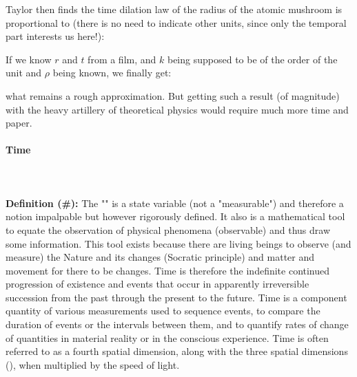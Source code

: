 	\begin{tcolorbox}[colframe=black,colback=white,sharp corners]
	
	Taylor then finds the time dilation law of the radius of the atomic mushroom is proportional to (there is no need to indicate other units, since only the temporal part interests us here!):
	
	If we know $r$ and $t$ from a film, and $k$ being supposed to be of the order of the unit and $\rho$ being known, we finally get:
	
	what remains a rough approximation. But getting such a result (of magnitude) with the heavy artillery of theoretical physics would require much more time and paper.
	\end{tcolorbox}
	
	\paragraph{Time}\mbox{}\\\\
	\textbf{Definition (\#\mydef):} The "" is a state variable (not a "measurable") and therefore a notion impalpable but however rigorously defined. It also is a mathematical tool to equate the observation of physical phenomena (observable) and thus draw some information. This tool exists because there are living beings to observe (and measure) the Nature and its changes (Socratic principle) and matter and movement for there to be changes. Time is therefore the indefinite continued progression of existence and events that occur in apparently irreversible succession from the past through the present to the future. Time is a component quantity of various measurements used to sequence events, to compare the duration of events or the intervals between them, and to quantify rates of change of quantities in material reality or in the conscious experience. Time is often referred to as a fourth spatial dimension, along with the three spatial dimensions (), when multiplied by the speed of light.
	
